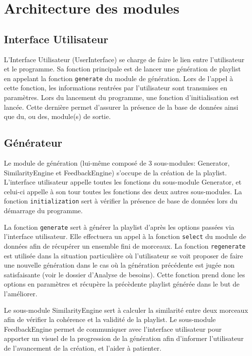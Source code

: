 
\section{Architecture des modules}
\label{archi:modules}

\subsection{Interface Utilisateur}
\label{archi:modules:iu}

L'Interface Utilisateur (UserInterface) se charge de faire le lien entre
l'utilisateur et le programme. Sa fonction principale est de lancer une
génération de playlist en appelant la fonction \texttt{generate} du module de 
génération. Lors de l'appel à cette fonction, les informations rentrées par 
l'utilisateur sont transmises en paramètres. Lors du lancement du programme,
 une fonction d'initialisation est lancée. Cette dernière permet d'assurer 
 la présence de la base de données ainsi que du, ou des, module(s) de sortie.

\subsection{Générateur}
\label{archi:modules:generateur}

Le module de génération (lui-même composé de 3 sous-modules: Generator, 
SimilarityEngine et FeedbackEngine) s'occupe de la création de la playlist. 
L'interface utilisateur appelle toutes les fonctions du sous-module 
Generator, et celui-ci appelle à son tour toutes les fonctions des deux 
autres sous-modules. La fonction \texttt{initialization} sert à vérifier la 
présence de base de données lors du démarrage du programme. 

La fonction \texttt{generate} sert à générer la playlist d'après les options 
passées via l'interface utilisateur. Elle effectuera un appel à la fonction 
\texttt{select} du module de données afin de récupérer un ensemble fini de morceaux.
 La fonction \texttt{regenerate} est utilisée dans la situation particulière où 
 l'utilisateur se voit proposer de faire une nouvelle génération dans le cas 
 où la génération précédente est jugée non satisfaisante (voir le dossier 
 d'Analyse de besoins). Cette fonction prend donc les options en paramètres 
 et récupère la précèdente playlist générée dans le but de l'améliorer.

Le sous-module SimilarityEngine sert à calculer la similarité entre deux 
morceaux afin de vérifier la cohérence et la validité de la playlist. Le 
sous-module FeedbackEngine permet de communiquer avec l'interface 
utilisateur pour apporter un visuel de la progression de la génération afin 
d'informer l'utilisateur de l'avancement de la création, et l'aider à 
patienter.

